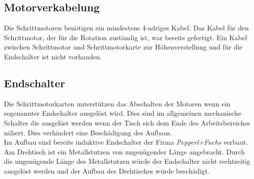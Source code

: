 \subsection{Motorverkabelung}
Die Schrittmotoren benötigen ein mindestens 4-adriges Kabel. Das Kabel für den Schrittmotor, der für die Rotation zuständig ist, war bereits gefertigt. Ein Kabel zwischen Schrittmotor und Schrittmotorkarte zur Höhenverstellung und für die Endschalter ist nicht vorhanden. 


\subsection{Endschalter}
Die Schrittmotorkarten unterstützen das Abschalten der Motoren wenn ein sogenannter Endschalter ausgelöst wird. Dies sind im allgemeinen mechanische Schalter die ausgelöst werden wenn der Tisch sich dem Ende des Arbeitsbereiches nähert. Dies verhindert eine Beschädigung des Aufbaus.\\
Im Aufbau sind bereits induktive Endschalter der Firma \textit{Pepperl+Fuchs} verbaut. 
Am Drehtisch ist ein Metallstutzen von ungenügender Länge angebracht. Durch die ungenügende Länge des Metallstutzen würde der Endschalter nicht rechtzeitig ausgelöst werden und der Aufbau des Drehtisches würde beschädigt.

